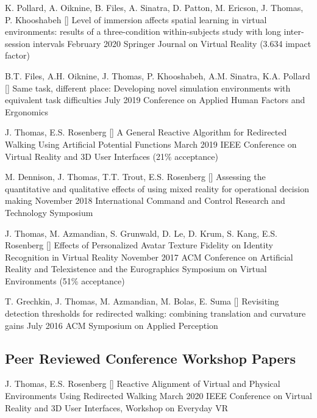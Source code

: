 \begin{cventries}
  \cventry
    {K. Pollard, A. Oiknine, B. Files, A. Sinatra, D. Patton, M. Ericson, J. Thomas, P. Khooshabeh}
    {[\thenpubs] Level of immersion affects spatial learning in virtual environments: results of a three-condition within-subjects study with long inter-session intervals}
    {February 2020}
    {}
    {Springer Journal on Virtual Reality (3.634 impact factor)}
    
  \cventry
    {B.T. Files, A.H. Oiknine, J. Thomas, P. Khooshabeh, A.M. Sinatra, K.A. Pollard} %
    {[\thenpubs] Same task, different place: Developing novel simulation environments with equivalent task difficulties} %
    {July 2019} %
    {} %
    {Conference on Applied Human Factors and Ergonomics} %

  \cventry
    {J. Thomas, E.S. Rosenberg} %
    {[\thenpubs] A General Reactive Algorithm for Redirected Walking Using Artificial Potential Functions} %
    {March 2019} %
    {} %
    {IEEE Conference on Virtual Reality and 3D User Interfaces (21\% acceptance)}
    
  \cventry
    {M. Dennison, J. Thomas, T.T. Trout, E.S. Rosenberg} %
    {[\thenpubs] Assessing the quantitative and qualitative effects of using mixed reality for operational decision making} %
    {November 2018} %
    {} %
    {International Command and Control Research and Technology Symposium} %
    
  \cventry
    {J. Thomas, M. Azmandian, S. Grunwald, D. Le, D. Krum, S. Kang, E.S. Rosenberg} %
    {[\thenpubs] Effects of Personalized Avatar Texture Fidelity on Identity Recognition in Virtual Reality} %
    {November 2017} %
    {} %
    {ACM Conference on Artificial Reality and Telexistence and the Eurographics Symposium on Virtual Environments (51\% acceptance)} %
    
  \cventry
    {T. Grechkin, J. Thomas, M. Azmandian, M. Bolas, E. Suma} %
    {[\thenpubs] Revisiting detection thresholds for redirected walking: combining translation and curvature gains} %
    {July 2016} %
    {} %
    {ACM Symposium on Applied Perception} %
    
  \vspace{-.25cm}    
  \subsection*{Peer Reviewed Conference Workshop Papers}
  \cventry
    {J. Thomas, E.S. Rosenberg} %
    {[\thenpubs] Reactive Alignment of Virtual and Physical Environments Using Redirected Walking} %
    {March 2020} %
    {} %
    {IEEE Conference on Virtual Reality and 3D User Interfaces, Workshop on Everyday VR} %
    

\end{cventries}
